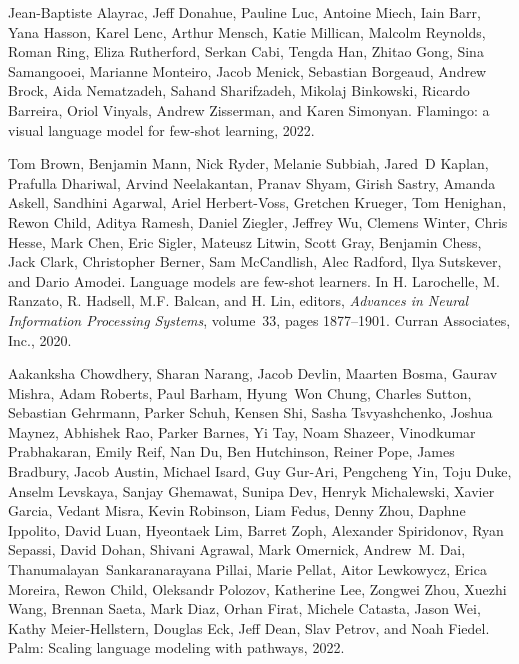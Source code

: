 \documentclass[10pt,twocolumn,letterpaper]{article}
\begin{document}
{\small

\begin{thebibliography}{10}\itemsep=-1pt

Jean-Baptiste Alayrac, Jeff Donahue, Pauline Luc, Antoine Miech, Iain Barr,
  Yana Hasson, Karel Lenc, Arthur Mensch, Katie Millican, Malcolm Reynolds,
  Roman Ring, Eliza Rutherford, Serkan Cabi, Tengda Han, Zhitao Gong, Sina
  Samangooei, Marianne Monteiro, Jacob Menick, Sebastian Borgeaud, Andrew
  Brock, Aida Nematzadeh, Sahand Sharifzadeh, Mikolaj Binkowski, Ricardo
  Barreira, Oriol Vinyals, Andrew Zisserman, and Karen Simonyan.
\newblock Flamingo: a visual language model for few-shot learning, 2022.

Tom Brown, Benjamin Mann, Nick Ryder, Melanie Subbiah, Jared~D Kaplan, Prafulla
  Dhariwal, Arvind Neelakantan, Pranav Shyam, Girish Sastry, Amanda Askell,
  Sandhini Agarwal, Ariel Herbert-Voss, Gretchen Krueger, Tom Henighan, Rewon
  Child, Aditya Ramesh, Daniel Ziegler, Jeffrey Wu, Clemens Winter, Chris
  Hesse, Mark Chen, Eric Sigler, Mateusz Litwin, Scott Gray, Benjamin Chess,
  Jack Clark, Christopher Berner, Sam McCandlish, Alec Radford, Ilya Sutskever,
  and Dario Amodei.
\newblock Language models are few-shot learners.
\newblock In H. Larochelle, M. Ranzato, R. Hadsell, M.F. Balcan, and H. Lin,
  editors, {\em Advances in Neural Information Processing Systems}, volume~33,
  pages 1877--1901. Curran Associates, Inc., 2020.

Aakanksha Chowdhery, Sharan Narang, Jacob Devlin, Maarten Bosma, Gaurav Mishra,
  Adam Roberts, Paul Barham, Hyung~Won Chung, Charles Sutton, Sebastian
  Gehrmann, Parker Schuh, Kensen Shi, Sasha Tsvyashchenko, Joshua Maynez,
  Abhishek Rao, Parker Barnes, Yi Tay, Noam Shazeer, Vinodkumar Prabhakaran,
  Emily Reif, Nan Du, Ben Hutchinson, Reiner Pope, James Bradbury, Jacob
  Austin, Michael Isard, Guy Gur-Ari, Pengcheng Yin, Toju Duke, Anselm
  Levskaya, Sanjay Ghemawat, Sunipa Dev, Henryk Michalewski, Xavier Garcia,
  Vedant Misra, Kevin Robinson, Liam Fedus, Denny Zhou, Daphne Ippolito, David
  Luan, Hyeontaek Lim, Barret Zoph, Alexander Spiridonov, Ryan Sepassi, David
  Dohan, Shivani Agrawal, Mark Omernick, Andrew~M. Dai,
  Thanumalayan~Sankaranarayana Pillai, Marie Pellat, Aitor Lewkowycz, Erica
  Moreira, Rewon Child, Oleksandr Polozov, Katherine Lee, Zongwei Zhou, Xuezhi
  Wang, Brennan Saeta, Mark Diaz, Orhan Firat, Michele Catasta, Jason Wei,
  Kathy Meier-Hellstern, Douglas Eck, Jeff Dean, Slav Petrov, and Noah Fiedel.
\newblock Palm: Scaling language modeling with pathways, 2022.


\end{thebibliography}}
\end{document}
